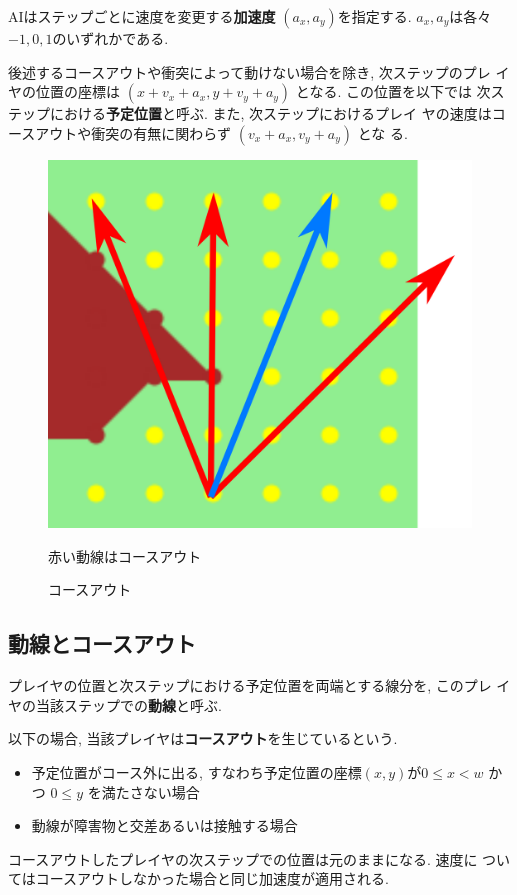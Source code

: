 \documentclass[11pt]{jarticle}
\begin{document}
AIはステップごとに速度を変更する{\bf 加速度} $(a_x, a_y)$を指定する.
$a_x, a_y$は各々$-1, 0, 1$のいずれかである.

後述するコースアウトや衝突によって動けない場合を除き, 次ステップのプレ
イヤの位置の座標は $(x+v_x+a_x, y+v_y+a_y)$ となる. この位置を以下では
次ステップにおける{\bf 予定位置}と呼ぶ. また, 次ステップにおけるプレイ
ヤの速度はコースアウトや衝突の有無に関わらず $(v_x+a_x, v_y+a_y)$ とな
る.

\begin{figure}
  \vspace{-1cm}
  \centering
  \includegraphics[width=0.26\columnwidth, natwidth=1358, natheight=1181]{courseout.png}
  \caption{コースアウト}
  \label{fig:courseout}
  赤い動線はコースアウト
  \vspace{-1cm}
\end{figure}

\subsection{動線とコースアウト}

プレイヤの位置と次ステップにおける予定位置を両端とする線分を, このプレ
イヤの当該ステップでの{\bf 動線}と呼ぶ.

以下の場合, 当該プレイヤは{\bf コースアウト}を生じているという.
\begin{itemize}
\item
  予定位置がコース外に出る, すなわち予定位置の座標$(x,y)$が$0 \le x <
  w$ かつ $0 \le y$ を満たさない場合
\item
  動線が障害物と交差あるいは接触する場合
\end{itemize}
コースアウトしたプレイヤの次ステップでの位置は元のままになる.  速度に
ついてはコースアウトしなかった場合と同じ加速度が適用される.
\end{document}
